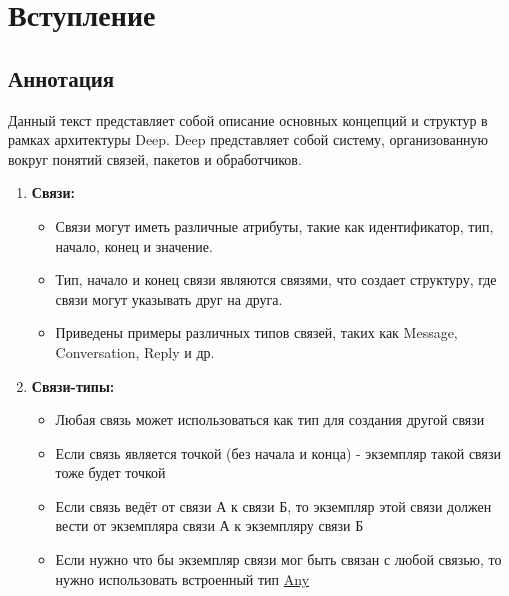 \section{Вступление}
\subsection{Аннотация}

Данный текст представляет собой описание основных концепций и структур в рамках
архитектуры Deep. Deep представляет собой систему, организованную вокруг
понятий связей, пакетов и обработчиков.

\begin{enumerate}
      \item \textbf{Связи:}
            \begin{itemize}
                  \item Связи могут иметь различные атрибуты, такие как
                        идентификатор,
                        тип, начало, конец и значение.
                  \item Тип, начало и конец связи являются связями, что создает
                        структуру, где связи могут указывать друг на друга.
                  \item Приведены примеры различных типов связей, таких как
                        Message,
                        Conversation, Reply и др.
            \end{itemize}

      \item \textbf{Связи-типы:}
            \begin{itemize}
                  \item Любая связь может использоваться как тип для создания
                        другой
                        связи
                  \item Если связь является точкой (без начала и конца) -
                        экземпляр
                        такой связи тоже будет точкой
                  \item Если связь ведёт от связи А к связи Б, то экземпляр
                        этой связи
                        должен вести от экземпляра связи А к экземпляру связи Б
                  \item Если нужно что бы экземпляр связи мог быть связан с
                        любой
                        связью,
                        то нужно использовать встроенный тип
                        \hyperlink{Core.Any.Description}{Any}
            \end{itemize}


\end{enumerate}
